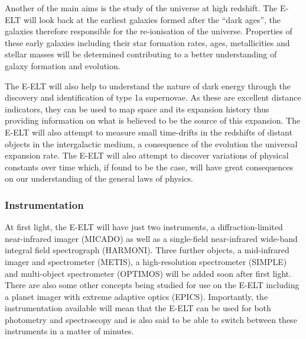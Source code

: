 		Another of the main aims is the study of the universe at high redshift. The E-ELT will look back at the earliest galaxies formed after the ``dark ages'', the galaxies therefore responsible for the re-ionisation of the universe. Properties of these early galaxies including their star formation rates, ages, metallicities and stellar masses will be determined contributing to a better understanding of galaxy formation and evolution.

		The E-ELT will also help to understand the nature of dark energy through the discovery and identification of type 1a supernovae. As these are excellent distance indicators, they can be used to map space and its expansion history thus providing information on what is believed to be the source of this expansion. The E-ELT will also attempt to measure small time-drifts in the redshifts of distant objects in the intergalactic medium, a consequence of the evolution the universal expansion rate. The E-ELT will also attempt to discover variations of physical constants over time which, if found to be the case, will have great consequences on our understanding of the general laws of physics.

	\subsubsection{Instrumentation} %
	\label{ssub:instrumentation}
		At first light, the E-ELT will have just two instruments\cite{E_ELT_Instrumentation}, a diffraction-limited near-infrared imager (MICADO) as well as a single-field near-infrared wide-band integral field spectrograph (HARMONI). Three further objects, a mid-infrared imager and spectrometer (METIS), a high-resolution spectrometer (SIMPLE) and multi-object spectrometer (OPTIMOS) will be added soon after first light\cite{E_ELT_Instrumentation}. There are also some other concepts being studied for use on the E-ELT including a planet imager with extreme adaptive optics (EPICS). Importantly, the instrumentation available will mean that the E-ELT can be used for both photometry and spectroscopy and is also said to be able to switch between these instruments in a matter of minutes.
